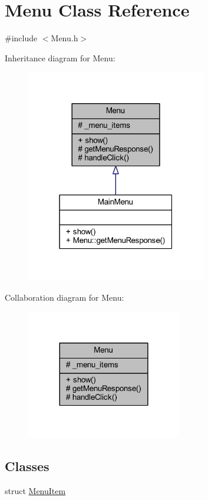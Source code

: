 \hypertarget{class_menu}{\section{Menu Class Reference}
\label{class_menu}
}


{\ttfamily \#include $<$Menu.\+h$>$}



Inheritance diagram for Menu\+:\nopagebreak
\begin{figure}[H]
\begin{center}
\leavevmode
\includegraphics[width=223pt]{class_menu__inherit__graph}
\end{center}
\end{figure}


Collaboration diagram for Menu\+:\nopagebreak
\begin{figure}[H]
\begin{center}
\leavevmode
\includegraphics[width=192pt]{class_menu__coll__graph}
\end{center}
\end{figure}
\subsection*{Classes}
\begin{DoxyCompactItemize}
\item 
struct \hyperlink{struct_menu_1_1_menu_item}{Menu\+Item}
\end{DoxyCompactItemize}
